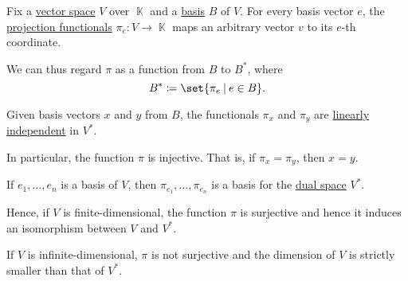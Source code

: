 \begin{proposition}\label{thm:algebraic_dual_basis}
  Fix a \hyperref[def:vector_space]{vector space} \( V \) over \( \BbbK \) and a \hyperref[def:hamel_basis]{basis} \( B \) of \( V \). For every basis vector \( e \), the \hyperref[def:basis_decomposition]{projection functionals} \( \pi_e: V \to \BbbK \) maps an arbitrary vector \( v \) to its \( e \)-th coordinate.

  We can thus regard \( \pi \) as a function from \( B \) to \( B^* \), where
  \begin{equation*}
    B^* \coloneqq \set{ \pi_e \given e \in B }.
  \end{equation*}

  \begin{thmenum}
     Given basis vectors \( x \) and \( y \) from \( B \), the functionals \( \pi_x \) and \( \pi_y \) are \hyperref[def:linear_dependence]{linearly independent} in \( V^* \).

    In particular, the function \( \pi \) is injective. That is, if \( \pi_x = \pi_y \), then \( x = y \).

     If \( e_1, \ldots, e_n \) is a basis of \( V \), then \( \pi_{e_1}, \ldots, \pi_{e_n} \) is a basis for the \hyperref[def:dual_vector_space]{dual space} \( V^* \).

    Hence, if \( V \) is finite-dimensional, the function \( \pi \) is surjective and hence it induces an isomorphism between \( V \) and \( V^* \).

     If \( V \) is infinite-dimensional, \( \pi \) is not surjective and the dimension of \( V \) is strictly smaller than that of \( V^* \).
  \end{thmenum}
\end{proposition}
